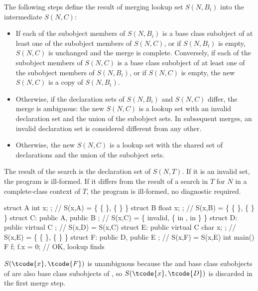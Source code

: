 \pnum
The following steps define the result of merging lookup set $S(N,B_i)$
into the intermediate $S(N,C)$:

\begin{itemize}
\item If each of the subobject members of $S(N,B_i)$ is a base class
subobject of at least one of the subobject members of $S(N,C)$, or if
$S(N,B_i)$ is empty, $S(N,C)$ is unchanged and the merge is complete.
Conversely, if each of the subobject members of $S(N,C)$ is a base class
subobject of at least one of the subobject members of $S(N,B_i)$, or if
$S(N,C)$ is empty, the new $S(N,C)$ is a copy of $S(N,B_i)$.

\item Otherwise, if the declaration sets of $S(N,B_i)$ and $S(N,C)$
differ, the merge is ambiguous: the new $S(N,C)$ is a lookup set with an
invalid declaration set and the union of the subobject sets. In
subsequent merges, an invalid declaration set is considered different
from any other.

\item Otherwise, the new $S(N,C)$ is a lookup set with the shared set of
declarations and the union of the subobject sets.
\end{itemize}

\pnum
The result of the search is the declaration set of $S(N,T)$.
If it is an invalid set, the program is ill-formed.
If it differs from the result of a search in $T$ for $N$
in a complete-class context of $T$,
the program is ill-formed, no diagnostic required.
\begin{example}
\begin{codeblock}
struct A { int x; };                    // S(x,A) = \{ \{  \}, \{  \} \}
struct B { float x; };                  // S(x,B) = \{ \{  \}, \{  \} \}
struct C: public A, public B { };       // S(x,C) = \{ invalid, \{  in ,  in  \} \}
struct D: public virtual C { };         // S(x,D) = S(x,C)
struct E: public virtual C { char x; }; // S(x,E) = \{ \{  \}, \{  \} \}
struct F: public D, public E { };       // S(x,F) = S(x,E)
int main() {
  F f;
  f.x = 0;                              // OK, lookup finds 
}
\end{codeblock}

$S(\tcode{x},\tcode{F})$ is unambiguous because the  and  base
class subobjects of  are also base class subobjects of , so
$S(\tcode{x},\tcode{D})$ is discarded in the first merge step.
\end{example}

